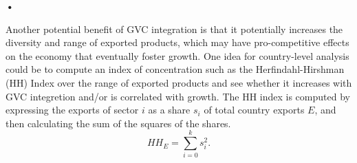 \textbf{\textbf{•}}\documentclass[a4paper]{article}
\begin{document}
Another potential benefit of GVC integration is that it potentially increases the diversity and range of exported products, which may have pro-competitive effects on the economy that eventually foster growth. One idea for country-level analysis could be to compute an index of concentration such as the Herfindahl-Hirshman (HH) Index over the range of exported products and see whether it increases with GVC integretion and/or is correlated with growth. The HH index is computed by expressing the exports of sector $i$ as a share $s_i$ of total country exports $E$, and then calculating the sum of the squares of the shares. 
\begin{equation}
HH_E = \sum_{i =0}^k s_i^2. 
\end{equation} 
\end{document}
